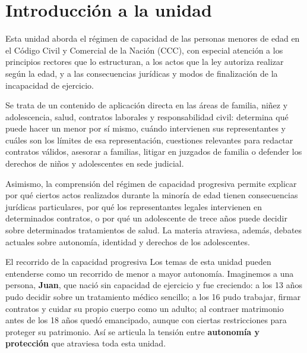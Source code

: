 \documentclass[12pt,oneside]{book}
\begin{document}
\chapter*{Introducción a la unidad}

Esta unidad aborda el régimen de capacidad de las personas menores de edad en el Código Civil y Comercial de la Nación (CCC), con especial atención a los principios rectores que lo estructuran, a los actos que la ley autoriza realizar según la edad, y a las consecuencias jurídicas y modos de finalización de la incapacidad de ejercicio.

Se trata de un contenido de aplicación directa en las áreas de familia, niñez y adolescencia, salud, contratos laborales y responsabilidad civil: determina qué puede hacer un menor por sí mismo, cuándo intervienen sus representantes y cuáles son los límites de esa representación, cuestiones relevantes para redactar contratos válidos, asesorar a familias, litigar en juzgados de familia o defender los derechos de niños y adolescentes en sede judicial.

Asimismo, la comprensión del régimen de capacidad progresiva permite explicar por qué ciertos actos realizados durante la minoría de edad tienen consecuencias jurídicas particulares, por qué los representantes legales intervienen en determinados contratos, o por qué un adolescente de trece años puede decidir sobre determinados tratamientos de salud. La materia atraviesa, además, debates actuales sobre autonomía, identidad y derechos de los adolescentes.

\begin{example}{El recorrido de la capacidad progresiva}
Los temas de esta unidad pueden entenderse como un recorrido de menor a mayor autonomía. Imaginemos a una persona, \textbf{Juan}, que nació sin capacidad de ejercicio y fue creciendo: a los 13 años pudo decidir sobre un tratamiento médico sencillo; a los 16 pudo trabajar, firmar contratos y cuidar su propio cuerpo como un adulto; al contraer matrimonio antes de los 18 años quedó emancipado, aunque con ciertas restricciones para proteger su patrimonio. Así se articula la tensión entre \textbf{autonomía y protección} que atraviesa toda esta unidad.
\end{example}
\end{document}
